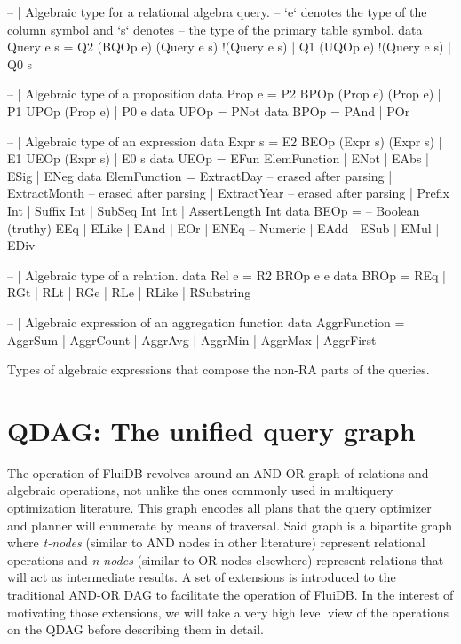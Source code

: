 \begin{code}
  \begin{haskellcode}
   -- | Algebraic type for a relational algebra query.
   -- `e` denotes the type of the column symbol and `s` denotes
   -- the type of the primary table symbol.
   data Query e s = Q2 (BQOp e) (Query e s) !(Query e s)
    | Q1 (UQOp e) !(Query e s)
    | Q0 s

    -- | Algebraic type of a proposition
    data Prop e = P2 BPOp (Prop e) (Prop e)
      | P1 UPOp (Prop e)
      | P0 e
    data UPOp = PNot
    data BPOp = PAnd | POr

    -- | Algebraic type of an expression
    data Expr s = E2 BEOp (Expr s) (Expr s)
      | E1 UEOp (Expr s)
      | E0 s
    data UEOp =
      EFun ElemFunction
      | ENot
      | EAbs
      | ESig
      | ENeg
    data ElemFunction
      = ExtractDay -- erased after parsing
      | ExtractMonth -- erased after parsing
      | ExtractYear -- erased after parsing
      | Prefix Int
      | Suffix Int
      | SubSeq Int Int
      | AssertLength Int
    data BEOp =
      -- Boolean (truthy)
      EEq | ELike | EAnd | EOr | ENEq
      -- Numeric
      | EAdd | ESub | EMul | EDiv

    -- | Algebraic type of a relation.
    data Rel e = R2 BROp e e
    data BROp
      = REq
      | RGt
      | RLt
      | RGe
      | RLe
      | RLike
      | RSubstring

    -- | Algebraic expression of an aggregation function
    data AggrFunction = AggrSum
      | AggrCount
      | AggrAvg
      | AggrMin
      | AggrMax
      | AggrFirst
  \end{haskellcode}
  \caption{\label{lst:expr_types} Types of algebraic expressions that compose the non-RA parts of the queries.}
\end{code}

\section{QDAG: The unified query graph}
\label{sec:qdag}

The operation of FluiDB revolves around an AND-OR graph of relations
and algebraic operations, not unlike the ones commonly used in
multiquery optimization literature. This graph encodes all plans that
the query optimizer and planner will enumerate by means of
traversal. Said graph is a bipartite graph where \emph{t-nodes}
(similar to AND nodes in other literature) represent relational
operations and \emph{n-nodes} (similar to OR nodes elsewhere)
represent relations that will act as intermediate results.  A set of
extensions is introduced to the traditional AND-OR DAG to facilitate
the operation of FluiDB. In the interest of motivating those
extensions, we will take a very high level view of the operations on
the QDAG before describing them in detail.

